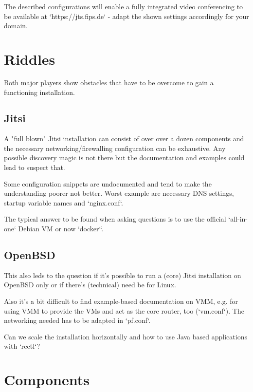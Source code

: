 \documentclass[10pt,conference]{IEEEtran}
\begin{document}
The described configurations will enable a fully integrated video conferencing
to be available at `https://jts.fips.de` - adapt the shown settings accordingly for your domain.

\section{Riddles}
Both major players show obstacles that have to be overcome to gain a functioning installation.

\subsection{Jitsi}
A "full blown" Jitsi installation can consist of over over a dozen components and the
necessary networking/firewalling configuration can be exhaustive. Any possible discovery
magic is not there but the documentation and examples could lead to suspect that.

Some configuration snippets are undocumented and tend to make the understanding poorer
not better. Worst example are necessary DNS settings, startup variable names and `nginx.conf`.

The typical answer to be found when asking questions is to use the official `all-in-one`
Debian VM or now `docker``.

\subsection{OpenBSD}
This also leds to the question if it's possible to run a (core) Jitsi installation on
OpenBSD only or if there's (technical) need be for Linux.

Also it's a bit difficult to find example-based documentation on VMM, e.g. for using
VMM to provide the VMs and act as the core router, too (`vm.conf`). The networking needed
has to be adapted in `pf.conf`.

Can we scale the installation horizontally and how to use Java based applications
with `rcctl`?

\section{Components}
\end{document}
